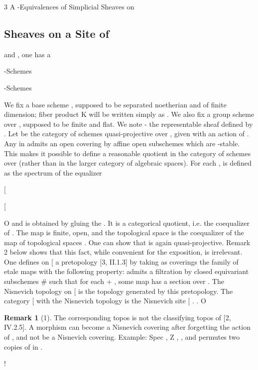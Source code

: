 \documentclass[11pt,a4paper]{article}
\theoremstyle{plain}
\theoremstyle{definition}
\newtheorem{remark}[theorem]{Remark}
\begin{document}
3 A -Equivalences of Simplicial Sheaves on
\subsection{Sheaves on a Site of}




and , one has a

-Schemes

-Schemes

We fix a base scheme , supposed to be separated noetherian and of finite dimension; fiber product K will be written simply as  . We also fix a group
scheme over , supposed to be finite and flat. We note - the representable sheaf
defined by .
Let
be the category of schemes quasi-projective over , given with an
action of . Any
in
admits an open covering  by affine open subschemes which are -stable. This makes it possible to define a reasonable quotient
in the category of schemes over
(rather than in the larger category of
algebraic spaces). For each  ,  is defined as the spectrum of the equalizer


[



 

 [

 





 





  O  
and  is obtained by gluing the  . It is a categorical quotient, i.e. the coequalizer of  
 . The map   is finite, open, and the topological space
  is the coequalizer of the map of topological spaces      . One can
show that  is again quasi-projective. Remark 2 below shows that this fact, while
convenient for the exposition, is irrelevant.
One defines on [ a pretopology [3, II.1.3] by taking as coverings the family
of etale maps 
 with the following property:  admits a filtration by closed
equivariant subschemes \#         
 such that for each + , some
map 
 has a section over    . The Nisnevich topology on [ is
the topology generated by this pretopology. The category [ with the Nisnevich
topology is the Nisnevich site [ .   .
O

\begin{remark}[1]
The corresponding topos is not the classifying topos of [2, IV.2.5]. A
morphism
can become a Nisnevich covering after forgetting the action of
, and not be a Nisnevich covering. Example:
Spec ,
Z ,
,
and permutes two copies of in .


  




 

!

 






 


\end{remark}
\end{document}
